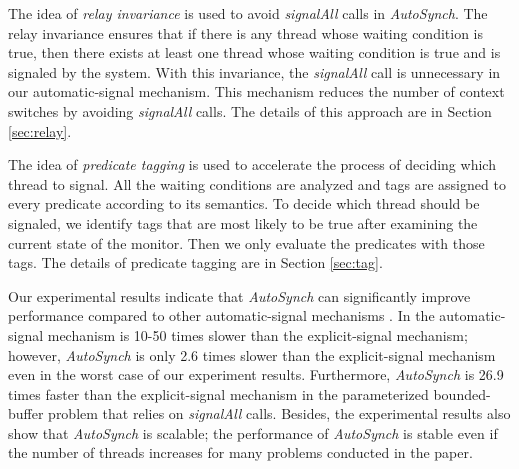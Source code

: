 \documentclass[preprint]{sigplanconf}
\begin{document}
The idea of {\em relay invariance} is used to avoid {\em signalAll} calls in {\em
AutoSynch}.
The relay invariance ensures that if there is any thread whose waiting condition is true, then
there exists at least one thread whose waiting condition is  true and is signaled by the system.
With this invariance, the {\em signalAll} call 
is unnecessary in our automatic-signal mechanism. This mechanism reduces 
the number of context switches by avoiding {\em signalAll} calls. 
The details of this approach are in Section \ref{sec:relay}.


The idea of {\em predicate tagging} is used to accelerate the process of deciding which thread to signal.
All the waiting conditions are analyzed and tags are assigned to every predicate
according to its semantics. To decide which thread should be 
signaled, we identify tags that are most likely to be true after examining the 
current state of the monitor. Then we only evaluate the predicates with 
those tags. 
The details of predicate tagging are in Section \ref{sec:tag}.

Our experimental results indicate that {\em AutoSynch} can significantly improve
performance compared to other automatic-signal mechanisms \cite{bh05}. In \cite{bfc95,bh05}
the automatic-signal mechanism is 10-50 times
slower than the explicit-signal mechanism; however, {\em AutoSynch} is 
only 2.6 times slower than the explicit-signal mechanism even in the worst 
case of our experiment results. Furthermore, {\em AutoSynch} is 26.9
times faster than the explicit-signal mechanism in the parameterized
bounded-buffer problem that relies on 
{\em signalAll} calls. Besides, the experimental results also show that {\em AutoSynch} 
is scalable; the performance of {\em AutoSynch} is stable even if the number of 
threads increases for many problems conducted in the paper. 
\end{document}
